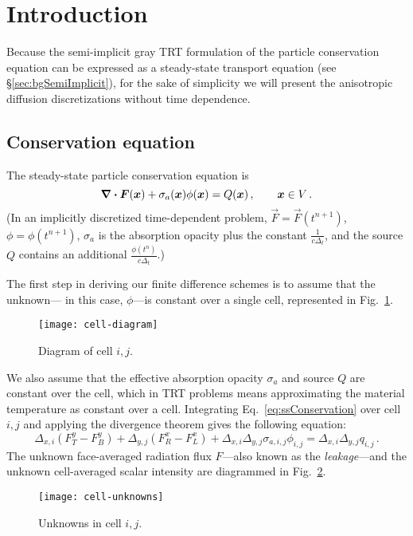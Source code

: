 \section{Introduction}

Because the semi-implicit gray TRT formulation of the particle conservation
equation can be expressed as a steady-state transport equation (see
\S\ref{sec:bgSemiImplicit}), for the sake of simplicity we will present the
anisotropic diffusion discretizations without time dependence.

\subsection{Conservation equation}

The steady-state particle conservation equation is
\begin{equation}\label{eq:ssConservation}
  \bm{\nabla} \bm{\cdot} \bm{F}(\bm{x}) + \sigma_a(\bm{x}) \phi(\bm{x}) =
  Q(\bm{x})\,,\qquad \bm{x} \in V\,.
\end{equation}
(In an implicitly discretized time-dependent problem,
$\vec{F}=\vec{F}(t^{n+1})$, $\phi=\phi(t^{n+1})$, $\sigma_a$ is 
the absorption opacity plus the constant $\frac{1}{c\Delta_t}$, and the source
$Q$ contains an additional $\frac{\phi(t^{n})}{c\Delta_t}$.) 

The first step in deriving our finite difference schemes is to assume that the
unknown---%
in this case, $\phi$---is constant over a single cell, represented in
Fig.~\ref{fig:cellDiagram}. 
%
\begin{figure}[tb]
  \centering
  \texttt{[image: cell-diagram]}
  \caption{Diagram of cell $i,j$.}
  \label{fig:cellDiagram}
\end{figure}
%
We also assume that the effective absorption opacity $\sigma_a$ and source $Q$
are
constant over the cell, which in TRT problems  means approximating the material
temperature as constant over a cell. Integrating Eq.~\eqref{eq:ssConservation} over cell
$i,j$ and applying the divergence theorem gives the following equation:
\begin{equation} \label{eq:ssConservationDisc}
  \Delta_{x,i} \left( F_T^y - F_B^y \right)
+ \Delta_{y,j} \left( F_R^x - F_L^x \right)
+ \Delta_{x,i}\Delta_{y,j} \sigma_{a,i,j} \phi_{i,j}
= \Delta_{x,i}\Delta_{y,j} q_{i,j}\,.
\end{equation}
The unknown face-averaged radiation flux $F$---also known as the
\emph{leakage}---and the
unknown cell-averaged scalar intensity are diagrammed in
Fig.~\ref{fig:cellUnknowns}.
%
\begin{figure}[htb]
  \centering
  \texttt{[image: cell-unknowns]}
  \caption{Unknowns in cell $i,j$.}
  \label{fig:cellUnknowns}
\end{figure}

